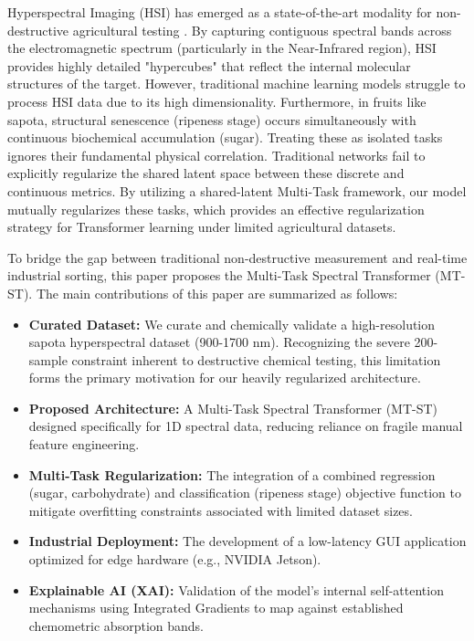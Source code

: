 \documentclass[pdflatex,sn-mathphys-num]{sn-jnl}
\begin{document}
Hyperspectral Imaging (HSI) has emerged as a state-of-the-art modality for non-destructive agricultural testing \cite{sun2010hyperspectral, elmasry2012principles, wei2014determination, qin2013hyperspectral}. By capturing contiguous spectral bands across the electromagnetic spectrum (particularly in the Near-Infrared region), HSI provides highly detailed "hypercubes" that reflect the internal molecular structures of the target. However, traditional machine learning models struggle to process HSI data due to its high dimensionality. Furthermore, in fruits like sapota, structural senescence (ripeness stage) occurs simultaneously with continuous biochemical accumulation (sugar). Treating these as isolated tasks ignores their fundamental physical correlation. Traditional networks fail to explicitly regularize the shared latent space between these discrete and continuous metrics. By utilizing a shared-latent Multi-Task framework, our model mutually regularizes these tasks, which provides an effective regularization strategy for Transformer learning under limited agricultural datasets.

To bridge the gap between traditional non-destructive measurement and real-time industrial sorting, this paper proposes the Multi-Task Spectral Transformer (MT-ST). The main contributions of this paper are summarized as follows:
\begin{itemize}
    \item \textbf{Curated Dataset:} We curate and chemically validate a high-resolution sapota hyperspectral dataset (900-1700 nm). Recognizing the severe 200-sample constraint inherent to destructive chemical testing, this limitation forms the primary motivation for our heavily regularized architecture.
    \item \textbf{Proposed Architecture:} A Multi-Task Spectral Transformer (MT-ST) designed specifically for 1D spectral data, reducing reliance on fragile manual feature engineering.
    \item \textbf{Multi-Task Regularization:} The integration of a combined regression (sugar, carbohydrate) and classification (ripeness stage) objective function to mitigate overfitting constraints associated with limited dataset sizes.
    \item \textbf{Industrial Deployment:} The development of a low-latency GUI application optimized for edge hardware (e.g., NVIDIA Jetson).
    \item \textbf{Explainable AI (XAI):} Validation of the model's internal self-attention mechanisms using Integrated Gradients to map against established chemometric absorption bands.
\end{itemize}
\end{document}
